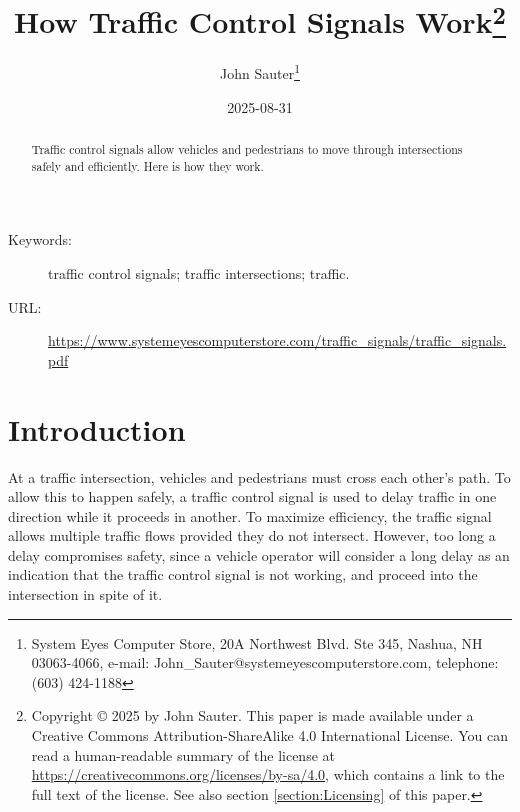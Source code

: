 \documentclass[letterpaper,twoside]{article}
\begin{document}
\title{How Traffic Control Signals Work\footnote{Copyright
    {\copyright} 2025 by John Sauter.
    This paper is made available under a
    Creative Commons Attribution-ShareAlike 4.0 International License.
    You can read a human-readable summary of the license at
    \href{https://creativecommons.org/licenses/by-sa/4.0}{https://creativecommons.org/licenses/by-sa/4.0},
    which contains a link to the full text of the license.
    See also section \ref{section:Licensing} of this paper.}
}
\author{John Sauter\footnote{
    System Eyes Computer Store,
    20A Northwest Blvd.  Ste 345,
    Nashua, NH  03063-4066,
    e-mail: John\_Sauter@systemeyescomputerstore.com,
    telephone: (603) 424-1188}}

\date{2025-08-31}
\maketitle
\begin{abstract}
  Traffic control signals allow vehicles and pedestrians to move through
  intersections safely and efficiently.  Here is how they work.
\end{abstract}
\begin{description}
\item[Keywords:]traffic control signals; traffic intersections; traffic.
\item[URL:]\href{https://www.systemeyescomputerstore.com/traffic\_signals/traffic\_signalst.pdf}{https://www.systemeyescomputerstore.com/traffic\_signals/traffic\_signals.pdf}
\end{description}
\newpage

\section{Introduction}
At a traffic intersection, vehicles and pedestrians must cross each other's
path.  To allow this to happen safely, a traffic control signal is used to
delay traffic in one direction while it proceeds in another.  To maximize
efficiency, the traffic signal allows multiple traffic flows provided they
do not intersect.  However, too long a delay compromises safety, since a
vehicle operator will consider a long delay as an indication that the
traffic control signal is not working, and proceed into the intersection
in spite of it.
\end{document}
